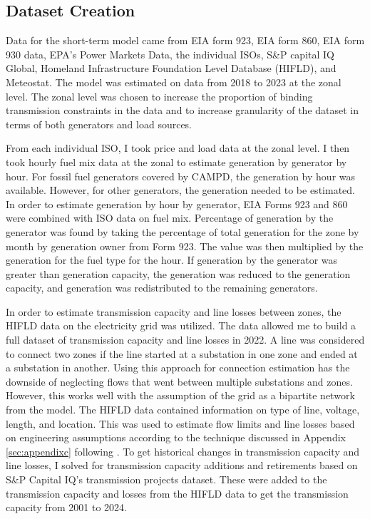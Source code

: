 \documentclass[12pt]{article}
\begin{document}
\subsection{Dataset Creation}

Data for the short-term model came from EIA form 923, EIA form 860, EIA form 930 data, EPA's Power Markets Data, the individual ISOs, S\&P capital IQ Global, Homeland Infrastructure Foundation Level Database (HIFLD), and Meteostat. The model was estimated on data from 2018 to 2023 at the zonal level. The zonal level was chosen to increase the proportion of binding transmission constraints in the data and to increase granularity of the dataset in terms of both generators and load sources.

From each individual ISO, I took price and load data at the zonal level. I then took hourly fuel mix data at the zonal to estimate generation by generator by hour. For fossil fuel generators covered by CAMPD, the generation by hour was available. However, for other generators, the generation needed to be estimated. In order to estimate generation by hour by generator, EIA Forms 923 and 860 were combined with ISO data on fuel mix. Percentage of generation by the generator was found by taking the percentage of total generation for the zone by month by generation owner from Form 923. The value was then multiplied by the generation for the fuel type for the hour. If generation by the generator was greater than generation capacity, the generation was reduced to the generation capacity, and generation was redistributed to the remaining generators.

In order to estimate transmission capacity and line losses between zones, the HIFLD data on the electricity grid was utilized. The data allowed me to build a full dataset of transmission capacity and line losses in 2022. A line was considered to connect two zones if the line started at a substation in one zone and ended at a substation in another. Using this approach for connection estimation has the downside of neglecting flows that went between multiple substations and zones. However, this works well with the assumption of the grid as a bipartite network from the model. The HIFLD data contained information on type of line, voltage, length, and location. This was used to estimate flow limits and line losses based on engineering assumptions according to the technique discussed in Appendix \ref{sec:appendixc} following \cite{arkolakis2023clean}. To get historical changes in transmission capacity and line losses, I solved for transmission capacity additions and retirements based on S\&P Capital IQ's transmission projects dataset. These were added to the transmission capacity and losses from the HIFLD data to get the transmission capacity from 2001 to 2024.
\end{document}
